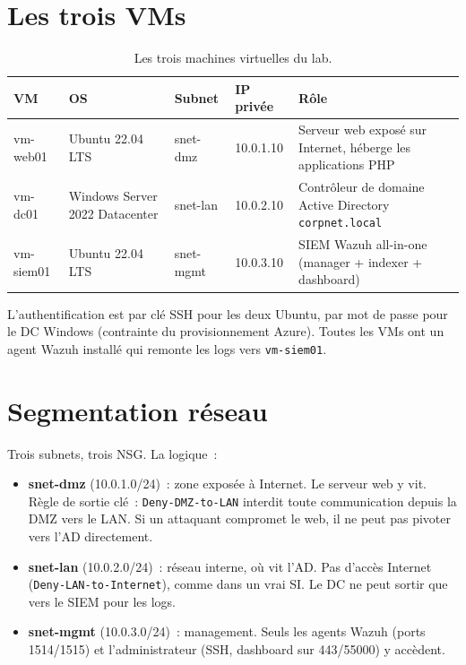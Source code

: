 \section{Les trois VMs}

\begin{table}[h]
\centering
\caption{Les trois machines virtuelles du lab.}
\label{tab:vms}
\small
\begin{tabularx}{\textwidth}{lXXXX}
\toprule
\textbf{VM} & \textbf{OS} & \textbf{Subnet} & \textbf{IP privée} & \textbf{Rôle} \\
\midrule
vm-web01 & Ubuntu 22.04 LTS & snet-dmz & 10.0.1.10 & Serveur web exposé sur Internet, héberge les applications PHP \\
vm-dc01 & Windows Server 2022 Datacenter & snet-lan & 10.0.2.10 & Contrôleur de domaine Active Directory \texttt{corpnet.local} \\
vm-siem01 & Ubuntu 22.04 LTS & snet-mgmt & 10.0.3.10 & SIEM Wazuh all-in-one (manager + indexer + dashboard) \\
\bottomrule
\end{tabularx}
\end{table}

L'authentification est par clé SSH pour les deux Ubuntu, par mot
de passe pour le DC Windows (contrainte du provisionnement Azure).
Toutes les VMs ont un agent Wazuh installé qui remonte les logs
vers \texttt{vm-siem01}.

\section{Segmentation réseau}

Trois subnets, trois NSG. La logique~:

\begin{itemize}
  \item \textbf{snet-dmz} (10.0.1.0/24)~: zone exposée à Internet.
    Le serveur web y vit. Règle de sortie clé~: \texttt{Deny-DMZ-to-LAN}
    interdit toute communication depuis la DMZ vers le LAN. Si
    un attaquant compromet le web, il ne peut pas pivoter vers
    l'AD directement.
  \item \textbf{snet-lan} (10.0.2.0/24)~: réseau interne, où vit
    l'AD. Pas d'accès Internet (\texttt{Deny-LAN-to-Internet}),
    comme dans un vrai SI. Le DC ne peut sortir que vers le SIEM
    pour les logs.
  \item \textbf{snet-mgmt} (10.0.3.0/24)~: management. Seuls les
    agents Wazuh (ports 1514/1515) et l'administrateur (SSH,
    dashboard sur 443/55000) y accèdent.
\end{itemize}


